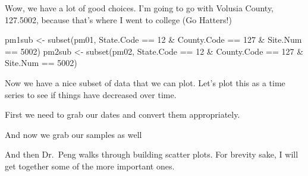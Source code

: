\documentclass[
]{article}
\newenvironment{Shaded}{\begin{snugshade}}{\end{snugshade}}
\newcommand{\DecValTok}[1]{\textcolor[rgb]{0.00,0.00,0.81}{#1}}
\newcommand{\FunctionTok}[1]{\textcolor[rgb]{0.00,0.00,0.00}{#1}}
\newcommand{\NormalTok}[1]{#1}
\newcommand{\OtherTok}[1]{\textcolor[rgb]{0.56,0.35,0.01}{#1}}
\newcommand{\SpecialCharTok}[1]{\textcolor[rgb]{0.00,0.00,0.00}{#1}}
\begin{document}
Wow, we have a lot of good choices. I'm going to go with Volusia County,
127.5002, because that's where I went to college (Go Hatters!)

\begin{Shaded}
\begin{Highlighting}[]
\NormalTok{pm1sub }\OtherTok{\textless{}{-}} \FunctionTok{subset}\NormalTok{(pm01, State.Code }\SpecialCharTok{==} \DecValTok{12} \SpecialCharTok{\&}\NormalTok{ County.Code }\SpecialCharTok{==} \DecValTok{127} \SpecialCharTok{\&}\NormalTok{ Site.Num }\SpecialCharTok{==} \DecValTok{5002}\NormalTok{)}
\NormalTok{pm2sub }\OtherTok{\textless{}{-}} \FunctionTok{subset}\NormalTok{(pm02, State.Code }\SpecialCharTok{==} \DecValTok{12} \SpecialCharTok{\&}\NormalTok{ County.Code }\SpecialCharTok{==} \DecValTok{127} \SpecialCharTok{\&}\NormalTok{ Site.Num }\SpecialCharTok{==} \DecValTok{5002}\NormalTok{)}
\end{Highlighting}
\end{Shaded}

Now we have a nice subset of data that we can plot. Let's plot this as a
time series to see if things have decreased over time.

First we need to grab our dates and convert them appropriately.

\begin{Shaded}
\end{Shaded}

And now we grab our samples as well

\begin{Shaded}
\end{Shaded}

And then Dr.~Peng walks through building scatter plots. For brevity
sake, I will get together some of the more important ones.
\end{document}
